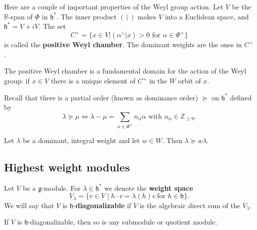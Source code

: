 \documentclass[12pt]{article}
\begin{document}
Here are a couple of important properties of the Weyl group action. Let $V$ be the $\mathbb{R}$-span of $\Phi$ in $\mathfrak{h}^*$. The inner product $(\,|\,)$ makes $V$ into a Euclidean space, and $\mathfrak{h}^* = V + iV$. The set
\[
    C^+ = \{ x \in V | (\alpha^\vee|x) > 0 \text{ for } \alpha \in \Phi^+ \}
\]
is called the \textbf{positive Weyl chamber}. The dominant weights are the ones in $C^+$.

\begin{proposition}\label{prop:fundamental_domain}
    The positive Weyl chamber is a fundamental domain for the action of the Weyl group:
    if $x \in V$ there is a unique element of $C^+$ in the $W$ orbit of $x$.
\end{proposition}

Recall that there is a partial order (known as dominance order) $\succeq$ on $\mathfrak{h}^*$ defined by
\[
    \lambda \succeq \mu \iff \lambda - \mu = \sum_{\alpha \in \Phi^+} n_\alpha \alpha \text{ with } n_\alpha \in \mathbb{Z}_{\geq 0}.
\]
\begin{proposition}
    Let $\lambda$ be a dominant, integral weight and let $w \in W$. Then $\lambda \succeq w\lambda$.
\end{proposition}

\subsection{Highest weight modules}
Let $V$ be a $\mathfrak{g}$-module. For $\lambda \in \mathfrak{h}^*$ we denote the \textbf{weight space}
\[
    V_\lambda = \{ v \in V \mid h \cdot v = \lambda(h)v \ \text{for } h \in \mathfrak{h} \}.
\]
We will say that $V$ is $\mathfrak{h}$-\textbf{diagonalizable} if $V$ is the algebraic direct sum of the $V_\lambda$.

\begin{proposition}
    If $V$ is $\mathfrak{h}$-diagonalizable, then so is any submodule or quotient module.
\end{proposition}
\end{document}
